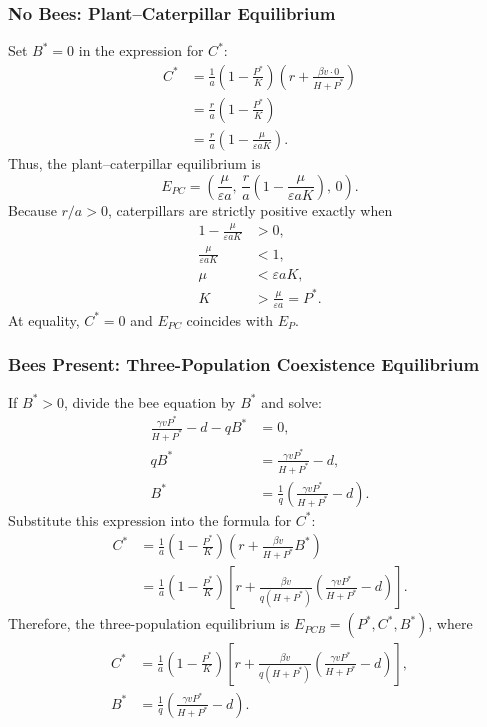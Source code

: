 \documentclass[11pt]{article}
\begin{document}
\subsubsection{No Bees: Plant--Caterpillar Equilibrium}

Set $B^*=0$ in the expression for $C^*$:
\begin{align*}
    C^* &= \frac{1}{a}\left(1-\frac{P^*}{K}\right)
    \left(r+\frac{\beta v\cdot 0}{H+P^*}\right) \\
        &= \frac{r}{a}\left(1-\frac{P^*}{K}\right) \\
        &= \frac{r}{a}\left(1-\frac{\mu}{\varepsilon aK}\right).
\end{align*}
Thus, the plant--caterpillar equilibrium is
\begin{equation}
    E_{PC}=\left(\frac{\mu}{\varepsilon a},\,
    \frac{r}{a}\left(1-\frac{\mu}{\varepsilon aK}\right),\,0\right).
\end{equation}
Because $r/a>0$, caterpillars are strictly positive exactly when
\begin{align*}
    1-\frac{\mu}{\varepsilon aK} &> 0, \\
    \frac{\mu}{\varepsilon aK} &< 1, \\
    \mu &< \varepsilon aK, \\
    K &> \frac{\mu}{\varepsilon a}=P^*.
\end{align*}
At equality, $C^*=0$ and $E_{PC}$ coincides with $E_P$.

\subsubsection{Bees Present: Three-Population Coexistence Equilibrium}

If $B^*>0$, divide the bee equation by $B^*$ and solve:
\begin{align*}
    \frac{\gamma vP^*}{H+P^*}-d-qB^* &= 0, \\
    qB^* &= \frac{\gamma vP^*}{H+P^*}-d, \\
    B^* &= \frac{1}{q}
    \left(\frac{\gamma vP^*}{H+P^*}-d\right).
\end{align*}
Substitute this expression into the formula for $C^*$:
\begin{align*}
    C^* &= \frac{1}{a}\left(1-\frac{P^*}{K}\right)
    \left(r+\frac{\beta v}{H+P^*}B^*\right) \\
        &= \frac{1}{a}\left(1-\frac{P^*}{K}\right)
    \left[r+\frac{\beta v}{q(H+P^*)}
    \left(\frac{\gamma vP^*}{H+P^*}-d\right)\right].
\end{align*}
Therefore, the three-population equilibrium is
$E_{PCB}=(P^*,C^*,B^*)$, where
\begin{equation}
    \begin{aligned}
        C^* &= \frac{1}{a}\left(1-\frac{P^*}{K}\right)
        \left[r+\frac{\beta v}{q(H+P^*)}
        \left(\frac{\gamma vP^*}{H+P^*}-d\right)\right], \\
        B^* &= \frac{1}{q}
        \left(\frac{\gamma vP^*}{H+P^*}-d\right).
    \end{aligned}
\end{equation}
\end{document}
